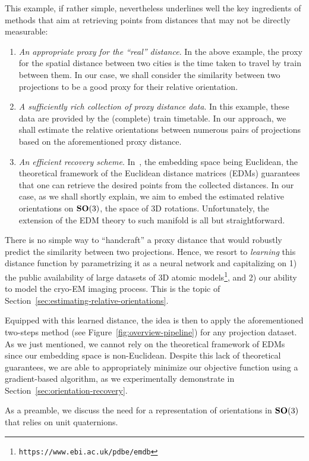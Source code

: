 This example, if rather simple, nevertheless underlines well the key ingredients of methods that aim at retrieving points from distances that may not be directly measurable:
\begin{enumerate}
    \item \textit{An appropriate proxy for the ``real'' distance}. In the above example, the proxy for the spatial distance between two cities is the time taken to travel by train between them. In our case, we shall consider the similarity between two projections to be a good proxy for their relative orientation.
    \item \textit{A sufficiently rich collection of proxy distance data}. In this example, these data are provided by the (complete) train timetable. In our approach, we shall estimate the relative orientations between numerous pairs of projections based on the aforementioned proxy distance.  
    \item \textit{An efficient recovery scheme}. In~\cite{dokmanic2015euclidean}, the embedding space being Euclidean, the theoretical framework of the Euclidean distance matrices (EDMs) guarantees that one can retrieve the desired points from the collected distances. In our case, as we shall shortly explain, we aim to embed the estimated relative orientations on $\mathrm{\mathbf{SO}}(3)$, the space of 3D rotations. Unfortunately, the extension of the EDM theory to such manifold is all but straightforward.
\end{enumerate}

There is no simple way to ``handcraft'' a proxy distance that would robustly predict the similarity between two projections. Hence, we resort to \textit{learning} this distance function by parametrizing it as a neural network and capitalizing on 1) the public availability of large datasets of 3D atomic models\footnote{\texttt{https://www.ebi.ac.uk/pdbe/emdb}}, and 2) our ability to model the cryo-EM imaging process. This is the topic of Section~\ref{sec:estimating-relative-orientations}. 

Equipped with this learned distance, the idea is then to apply the aforementioned two-steps method (see Figure~\ref{fig:overview-pipeline}) for any projection dataset. As we just mentioned, we cannot rely on the theoretical framework of EDMs since our embedding space is non-Euclidean. Despite this lack of theoretical guarantees, we are able to appropriately minimize our objective function using a gradient-based algorithm, as we experimentally demonstrate in Section~\ref{sec:orientation-recovery}.

As a preamble, we discuss the need for a representation of orientations in $\mathrm{\mathbf{SO}}(3)$ that relies on unit quaternions. 
